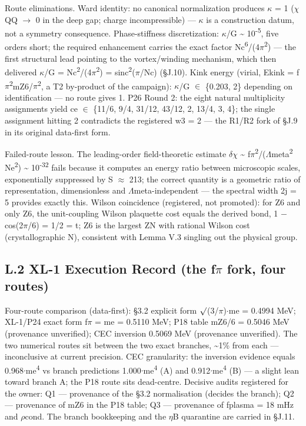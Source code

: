 \documentclass[11pt,letterpaper]{article}
\begin{document}
\noindent Route eliminations. Ward identity: no canonical normalization produces $\kappa$ = 1 ($\chi$QQ $\to$ 0 in the deep gap; charge incompressible) --- $\kappa$ is a construction datum, not a symmetry consequence. Phase-stiffness discretization: $\kappa$/G \textasciitilde{} 10\textsuperscript{-5}, five orders short; the required enhancement carries the exact factor Nc\textsuperscript{6}/(4$\pi$\textsuperscript{2}) --- the first structural lead pointing to the vortex/winding mechanism, which then delivered $\kappa$/G = Nc\textsuperscript{2}/(4$\pi$\textsuperscript{2}) = sinc\textsuperscript{2}($\pi$/Nc) (§J.10). Kink energy (virial, Ekink = f$\pi$\textsuperscript{2}mZ6/$\pi$\textsuperscript{2}, a T2 by-product of the campaign): $\kappa$/G $\in$ \{0.203, 2\} depending on identification --- no route gives 1. P26 Round 2: the eight natural multiplicity assignments yield ce $\in$ \{11/6, 9/4, 31/12, 43/12, 2, 13/4, 3, 4\}; the single assignment hitting 2 contradicts the registered w3 = 2 --- the R1/R2 fork of §J.9 in its original data-first form.

\noindent Failed-route lesson. The leading-order field-theoretic estimate $\delta$$\chi$ \textasciitilde{} f$\pi$\textsuperscript{2}/($\Lambda$meta\textsuperscript{2} Ne\textsuperscript{2}) \textasciitilde{} 10\textsuperscript{-32} fails because it computes an energy ratio between microscopic scales, exponentially suppressed by S $\approx$ 213; the correct quantity is a geometric ratio of representation, dimensionless and $\Lambda$meta-independent --- the spectral width 2j = 5 provides exactly this. Wilson coincidence (registered, not promoted): for Z6 and only Z6, the unit-coupling Wilson plaquette cost equals the derived bond, 1 $-$ cos(2$\pi$/6) = 1/2 = t; Z6 is the largest ZN with rational Wilson cost (crystallographic N), consistent with Lemma V.3 singling out the physical group.

\subsection*{L.2  XL-1 Execution Record (the f$\pi$ fork, four routes)}

\noindent Four-route comparison (data-first): §3.2 explicit form $\surd$(3/$\pi$)$\cdot$me = 0.4994 MeV; XL-1/P24 exact form f$\pi$ = me = 0.5110 MeV; P18 table mZ6/6 = 0.5046 MeV (provenance unverified); CEC inversion 0.5069 MeV (provenance unverified). The two numerical routes sit between the two exact branches, \textasciitilde{}1\% from each --- inconclusive at current precision. CEC granularity: the inversion evidence equals 0.968$\cdot$me\textsuperscript{4} vs branch predictions 1.000$\cdot$me\textsuperscript{4} (A) and 0.912$\cdot$me\textsuperscript{4} (B) --- a slight lean toward branch A; the P18 route sits dead-centre. Decisive audits registered for the owner: Q1 --- provenance of the §3.2 normalisation (decides the branch); Q2 --- provenance of mZ6 in the P18 table; Q3 --- provenance of fplasma = 18 mHz and $\rho$cond. The branch bookkeeping and the $\eta$B quarantine are carried in §J.11.
\end{document}
